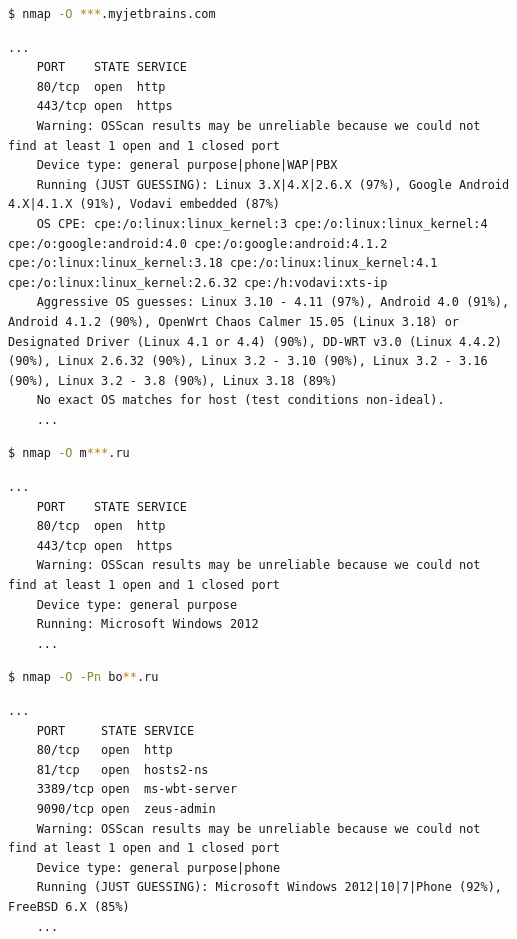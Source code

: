 \documentclass{article}
\begin{document}
\begin{thebibliography}{9}
\begin{lstlisting}[language=bash, basicstyle=\ttfamily\small]
    $ nmap -O ***.myjetbrains.com
\end{lstlisting}
\begin{lstlisting}[frame=lines, basicstyle=\ttfamily\small]
    ...
    PORT    STATE SERVICE
    80/tcp  open  http
    443/tcp open  https
    Warning: OSScan results may be unreliable because we could not find at least 1 open and 1 closed port
    Device type: general purpose|phone|WAP|PBX
    Running (JUST GUESSING): Linux 3.X|4.X|2.6.X (97%), Google Android 4.X|4.1.X (91%), Vodavi embedded (87%)
    OS CPE: cpe:/o:linux:linux_kernel:3 cpe:/o:linux:linux_kernel:4 cpe:/o:google:android:4.0 cpe:/o:google:android:4.1.2 cpe:/o:linux:linux_kernel:3.18 cpe:/o:linux:linux_kernel:4.1 cpe:/o:linux:linux_kernel:2.6.32 cpe:/h:vodavi:xts-ip
    Aggressive OS guesses: Linux 3.10 - 4.11 (97%), Android 4.0 (91%), Android 4.1.2 (90%), OpenWrt Chaos Calmer 15.05 (Linux 3.18) or Designated Driver (Linux 4.1 or 4.4) (90%), DD-WRT v3.0 (Linux 4.4.2) (90%), Linux 2.6.32 (90%), Linux 3.2 - 3.10 (90%), Linux 3.2 - 3.16 (90%), Linux 3.2 - 3.8 (90%), Linux 3.18 (89%)
    No exact OS matches for host (test conditions non-ideal).
    ...
\end{lstlisting}

\begin{lstlisting}[language=bash, basicstyle=\ttfamily\small]
    $ nmap -O m***.ru
\end{lstlisting}
\begin{lstlisting}[frame=lines, basicstyle=\ttfamily\small]
    ...
    PORT    STATE SERVICE
    80/tcp  open  http
    443/tcp open  https
    Warning: OSScan results may be unreliable because we could not find at least 1 open and 1 closed port
    Device type: general purpose
    Running: Microsoft Windows 2012
    ...
\end{lstlisting}
\begin{lstlisting}[language=bash, basicstyle=\ttfamily\small]
    $ nmap -O -Pn bo**.ru
\end{lstlisting}
\begin{lstlisting}[frame=lines, basicstyle=\ttfamily\small]
    ...
    PORT     STATE SERVICE
    80/tcp   open  http
    81/tcp   open  hosts2-ns
    3389/tcp open  ms-wbt-server
    9090/tcp open  zeus-admin
    Warning: OSScan results may be unreliable because we could not find at least 1 open and 1 closed port
    Device type: general purpose|phone
    Running (JUST GUESSING): Microsoft Windows 2012|10|7|Phone (92%), FreeBSD 6.X (85%)
    ...
\end{lstlisting}
\end{thebibliography}
\end{document}
